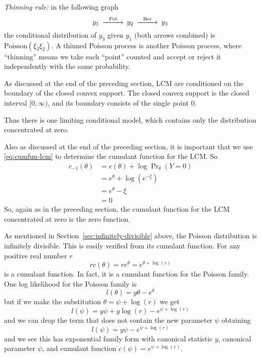 \begin{sloppypar}
\emph{Thinning rule:} in the following graph
$$
\begin{CD}
   y_1 @>\text{Poi}>> y_2 @>\text{Ber}>> y_3
\end{CD}
$$
the conditional distribution of $y_3$ given $y_1$ (both arrows combined)
is $\text{Poisson}(\xi_3 \xi_2)$.  A thinned Poisson process is another
Poisson process, where ``thinning'' means we take each ``point'' counted
and accept or reject it independently with the same probability.
\end{sloppypar}

As discussed at the end of the preceding section, LCM
are conditioned on the boundary of the closed convex support.
The closed convex support is the closed interval $[0, \infty)$, and its
boundary consists of the single point $0$.

Thus there is one limiting conditional model, which contains only
the distribution concentrated at zero.

Also as discussed at the end of the preceding section,
it is important that we use \eqref{eq:cumfun-lcm} to determine the cumulant
function for the LCM.  So
\begin{align*}
   c_{- 1}(\theta)
   & =
   c(\theta) + \log \Pr\nolimits_\theta(Y = 0)
   \\
   & =
   e^\theta 
   +
   \log (e^{- \xi})
   \\
   & =
   e^\theta 
   - \xi
   \\
   & =
   0
\end{align*}
So, again as in the preceding section, the cumulant function for the LCM
concentrated at zero is the zero function.

As mentioned in Section~\ref{sec:infinitely-divisible} above,
the Poisson distribution is infinitely divisible.
This is easily verified from its cumulant function.
For any positive real number $r$
$$
   r c(\theta) = r e^{\theta} = e^{\theta + \log(r)}
$$
is a cumulant function.  In fact, it is a cumulant function for the Poisson
family.  One log likelihood for the Poisson family is
$$
   l(\theta) = y \theta - e^\theta
$$
but if we make the substitution $\theta = \psi + \log(r)$ we get
$$
   l(\psi) = y \psi + y \log(r) - e^{\psi + \log(r)}
$$
and we can drop the term that does not contain the new parameter $\psi$
obtaining
$$
   l(\psi) = y \psi - e^{\psi + \log(r)}
$$
and we see this has exponential family form with canonical statistic $y$,
canonical parameter $\psi$,
and cumulant function $c(\psi) = e^{\psi + \log(r)}$.

